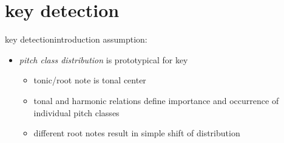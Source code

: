     \section{key detection}
        \begin{frame}{key detection}{introduction}
            assumption: 
            \begin{itemize}
                \item \textit{pitch class distribution} is prototypical for key
                    \begin{itemize}
                        \item	tonic/root note is tonal center
                        \item	tonal and harmonic relations define importance and occurrence of individual pitch classes
                        \item   different root notes result in simple shift of distribution
                    \end{itemize}
            \end{itemize}
        \end{frame}
